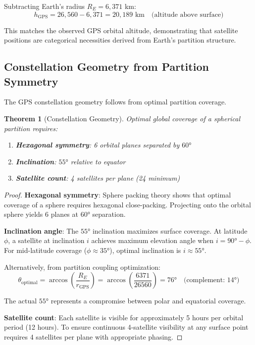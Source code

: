 \documentclass[twocolumn,10pt,a4paper]{article}
\newtheorem{theorem}{Theorem}[section]
\theoremstyle{definition}
\theoremstyle{remark}
\begin{document}
Subtracting Earth's radius $R_E = 6,371$ km:
\begin{equation}
    h_{\text{GPS}} = 26,560 - 6,371 = 20,189 \text{ km} \quad \text{(altitude above surface)}
\end{equation}

This matches the observed GPS orbital altitude, demonstrating that satellite positions are categorical necessities derived from Earth's partition structure.

\subsection{Constellation Geometry from Partition Symmetry}

The GPS constellation geometry follows from optimal partition coverage.

\begin{theorem}[Constellation Geometry]
\label{thm:constellation}
Optimal global coverage of a spherical partition requires:
\begin{enumerate}
    \item \textbf{Hexagonal symmetry}: 6 orbital planes separated by $60°$
    \item \textbf{Inclination}: $55°$ relative to equator
    \item \textbf{Satellite count}: 4 satellites per plane (24 minimum)
\end{enumerate}
\end{theorem}

\begin{proof}
\textbf{Hexagonal symmetry}: Sphere packing theory \cite{hales2005proof} shows that optimal coverage of a sphere requires hexagonal close-packing. Projecting onto the orbital sphere yields 6 planes at $60°$ separation.

\textbf{Inclination angle}: The $55°$ inclination maximizes surface coverage. At latitude $\phi$, a satellite at inclination $i$ achieves maximum elevation angle when $i = 90° - \phi$. For mid-latitude coverage ($\phi \approx 35°$), optimal inclination is $i \approx 55°$.

Alternatively, from partition coupling optimization:
\begin{equation}
    \theta_{\text{optimal}} = \arccos\left(\frac{R_E}{r_{\text{GPS}}}\right) = \arccos\left(\frac{6371}{26560}\right) = 76° \quad \text{(complement: } 14°)
\end{equation}

The actual $55°$ represents a compromise between polar and equatorial coverage.

\textbf{Satellite count}: Each satellite is visible for approximately 5 hours per orbital period (12 hours). To ensure continuous 4-satellite visibility at any surface point requires 4 satellites per plane with appropriate phasing.
\end{proof}
\end{document}
